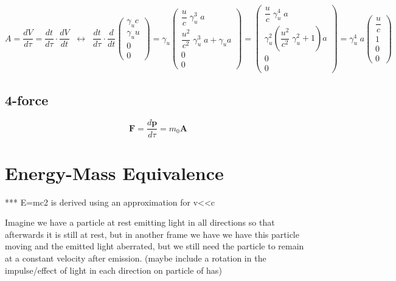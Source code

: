 \begin{equation}
    A=\dfrac{dV}{d\tau}=\dfrac{dt}{d\tau}\cdot\dfrac{dV}{dt} \;\;\leftrightarrow\;\; \dfrac{dt}{d\tau}\cdot \dfrac{d}{dt}\left(\begin{array}{*{20}{c}} \gamma_u c \\ \gamma_u u \\ 0 \\ 0 \end{array}\right) = \gamma_u\left(\begin{array}{*{20}{c}} \dfrac{u}{c}\;\gamma_u^3\;a \\ \dfrac{u^2}{c^2}\;\gamma_u^3\;a+\gamma_u a \\ 0 \\ 0 \end{array}\right) = \left(\begin{array}{*{20}{c}} \dfrac{u}{c}\;\gamma_u^4\;a \\ \gamma_u^2\left(\dfrac{u^2}{c^2}\;\gamma_u^2+1\right)a \\ 0 \\ 0 \end{array}\right) = \gamma_u^4\;a\left(\begin{array}{*{20}{c}} \dfrac{u}{c} \\ 1 \\ 0 \\ 0 \end{array}\right)
\end{equation}

\subsection{4-force}
\begin{equation}
    \mathbf{F}= \frac{d\mathbf{p}}{d\tau} = m_0\mathbf{A}
\end{equation}

\section{Energy-Mass Equivalence}

*** E=mc2 is derived using an approximation for v<<c

Imagine we have a particle at rest emitting light in all directions so that afterwards it is still at rest, but in another frame we have we have this particle moving and the emitted light aberrated, but we still need the particle to remain at a constant velocity after emission. (maybe include a rotation in the impulse/effect of light in each direction on particle of has)


